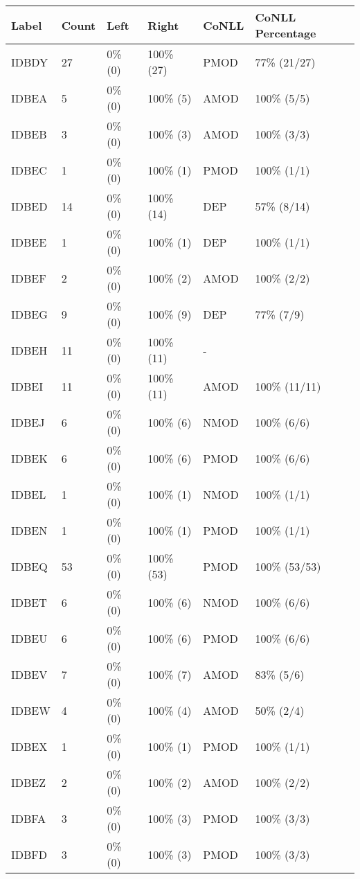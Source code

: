 \begin{figure*}
\begin{tabular}{|l|l|l|l||l|l|}
\hline
Label & Count & Left & Right & CoNLL & CoNLL Percentage\\ 
\hline
 IDBDY & 27 & 0\% (0) & 100\% (27) & PMOD & 77\% (21/27) \\ 
\hline
 IDBEA & 5 & 0\% (0) & 100\% (5) & AMOD & 100\% (5/5) \\ 
\hline
 IDBEB & 3 & 0\% (0) & 100\% (3) & AMOD & 100\% (3/3) \\ 
\hline
 IDBEC & 1 & 0\% (0) & 100\% (1) & PMOD & 100\% (1/1) \\ 
\hline
 IDBED & 14 & 0\% (0) & 100\% (14) & DEP & 57\% (8/14) \\ 
\hline
 IDBEE & 1 & 0\% (0) & 100\% (1) & DEP & 100\% (1/1) \\ 
\hline
 IDBEF & 2 & 0\% (0) & 100\% (2) & AMOD & 100\% (2/2) \\ 
\hline
 IDBEG & 9 & 0\% (0) & 100\% (9) & DEP & 77\% (7/9) \\ 
\hline
 IDBEH & 11 & 0\% (0) & 100\% (11) & - &  \\ 
\hline
 IDBEI & 11 & 0\% (0) & 100\% (11) & AMOD & 100\% (11/11) \\ 
\hline
 IDBEJ & 6 & 0\% (0) & 100\% (6) & NMOD & 100\% (6/6) \\ 
\hline
 IDBEK & 6 & 0\% (0) & 100\% (6) & PMOD & 100\% (6/6) \\ 
\hline
 IDBEL & 1 & 0\% (0) & 100\% (1) & NMOD & 100\% (1/1) \\ 
\hline
 IDBEN & 1 & 0\% (0) & 100\% (1) & PMOD & 100\% (1/1) \\ 
\hline
 IDBEQ & 53 & 0\% (0) & 100\% (53) & PMOD & 100\% (53/53) \\ 
\hline
 IDBET & 6 & 0\% (0) & 100\% (6) & NMOD & 100\% (6/6) \\ 
\hline
 IDBEU & 6 & 0\% (0) & 100\% (6) & PMOD & 100\% (6/6) \\ 
\hline
 IDBEV & 7 & 0\% (0) & 100\% (7) & AMOD & 83\% (5/6) \\ 
\hline
 IDBEW & 4 & 0\% (0) & 100\% (4) & AMOD & 50\% (2/4) \\ 
\hline
 IDBEX & 1 & 0\% (0) & 100\% (1) & PMOD & 100\% (1/1) \\ 
\hline
 IDBEZ & 2 & 0\% (0) & 100\% (2) & AMOD & 100\% (2/2) \\ 
\hline
 IDBFA & 3 & 0\% (0) & 100\% (3) & PMOD & 100\% (3/3) \\ 
\hline
 IDBFD & 3 & 0\% (0) & 100\% (3) & PMOD & 100\% (3/3) \\ 

\end{tabular}
\end{figure*}

